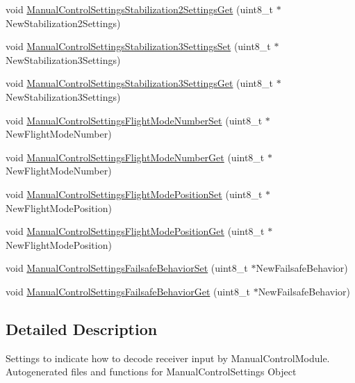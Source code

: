 \begin{DoxyCompactItemize}
\item 
void \hyperlink{group___manual_control_settings_ga68ebeaa75d37747c558f02e5c8aac76c}{\-Manual\-Control\-Settings\-Stabilization2\-Settings\-Get} (uint8\-\_\-t $\ast$\-New\-Stabilization2\-Settings)
\item 
void \hyperlink{group___manual_control_settings_ga3146d3ce94d458ae8b13d3c60fdc2fd4}{\-Manual\-Control\-Settings\-Stabilization3\-Settings\-Set} (uint8\-\_\-t $\ast$\-New\-Stabilization3\-Settings)
\item 
void \hyperlink{group___manual_control_settings_ga39d4b30af2fdd6c738ab508a6a10fbee}{\-Manual\-Control\-Settings\-Stabilization3\-Settings\-Get} (uint8\-\_\-t $\ast$\-New\-Stabilization3\-Settings)
\item 
void \hyperlink{group___manual_control_settings_gabb3bbf005907a6d4c3fea9146dc93e33}{\-Manual\-Control\-Settings\-Flight\-Mode\-Number\-Set} (uint8\-\_\-t $\ast$\-New\-Flight\-Mode\-Number)
\item 
void \hyperlink{group___manual_control_settings_ga4fe2c3115af857f96711a7ec4195d768}{\-Manual\-Control\-Settings\-Flight\-Mode\-Number\-Get} (uint8\-\_\-t $\ast$\-New\-Flight\-Mode\-Number)
\item 
void \hyperlink{group___manual_control_settings_gae94c96688999517d468810bfa173114a}{\-Manual\-Control\-Settings\-Flight\-Mode\-Position\-Set} (uint8\-\_\-t $\ast$\-New\-Flight\-Mode\-Position)
\item 
void \hyperlink{group___manual_control_settings_ga2026305303d12a2beaa747326af146ad}{\-Manual\-Control\-Settings\-Flight\-Mode\-Position\-Get} (uint8\-\_\-t $\ast$\-New\-Flight\-Mode\-Position)
\item 
void \hyperlink{group___manual_control_settings_ga82e82bb3d4c5620224aec6bb42f8d67e}{\-Manual\-Control\-Settings\-Failsafe\-Behavior\-Set} (uint8\-\_\-t $\ast$\-New\-Failsafe\-Behavior)
\item 
void \hyperlink{group___manual_control_settings_ga648847b0ef457168de0c9c1818db41fa}{\-Manual\-Control\-Settings\-Failsafe\-Behavior\-Get} (uint8\-\_\-t $\ast$\-New\-Failsafe\-Behavior)
\end{DoxyCompactItemize}


\subsection{\-Detailed \-Description}
\-Settings to indicate how to decode receiver input by \-Manual\-Control\-Module. \-Autogenerated files and functions for \-Manual\-Control\-Settings \-Object 

